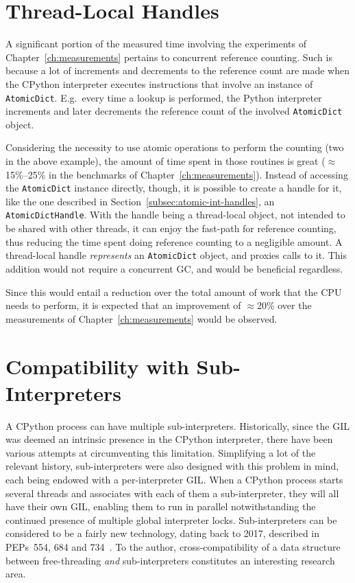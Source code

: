 \section{Thread-Local Handles}\label{sec:atomicdicthandle}

A significant portion of the measured time involving the experiments of Chapter~\ref{ch:measurements} pertains to concurrent reference counting.
Such is because a lot of increments and decrements to the reference count are made when the CPython interpreter executes instructions that involve an instance of \texttt{AtomicDict}.
E.g.\ every time a lookup is performed, the Python interpreter increments and later decrements the reference count of the involved \texttt{AtomicDict} object.

Considering the necessity to use atomic operations to perform the counting (two in the above example), the amount of time spent in those routines is great ($\approx$15\%--25\% in the benchmarks of Chapter~\ref{ch:measurements}).
Instead of accessing the \texttt{AtomicDict} instance directly, though, it is possible to create a handle for it, like the one described in Section~\ref{subsec:atomic-int-handles}, an \texttt{AtomicDictHandle}.
With the handle being a thread-local object, not intended to be shared with other threads, it can enjoy the fast-path for reference counting, thus reducing the time spent doing reference counting to a negligible amount.
A thread-local handle \emph{represents} an \texttt{AtomicDict} object, and proxies calls to it.
This addition would not require a concurrent GC, and would be beneficial regardless.

Since this would entail a reduction over the total amount of work that the CPU needs to perform, it is expected that an improvement of $\approx$20\% over the measurements of Chapter~\ref{ch:measurements} would be observed.


\section{Compatibility with Sub-Interpreters}\label{sec:compatibility-with-sub-interpreters}

A CPython process can have multiple sub-interpreters.
Historically, since the GIL was deemed an intrinsic presence in the CPython interpreter, there have been various attempts at circumventing this limitation.
Simplifying a lot of the relevant history, sub-interpreters were also designed with this problem in mind, each being endowed with a per-interpreter GIL\@.
When a CPython process starts several threads and associates with each of them a sub-interpreter, they will all have their own GIL, enabling them to run in parallel notwithstanding the continued presence of multiple global interpreter locks.
Sub-interpreters can be considered to be a fairly new technology, dating back to 2017, described in PEPs~554, 684 and 734~\cite{pep554,pep684,pep734}.
To the author, cross-compatibility of a data structure between free-threading \emph{and} sub-interpreters constitutes an interesting research area.

